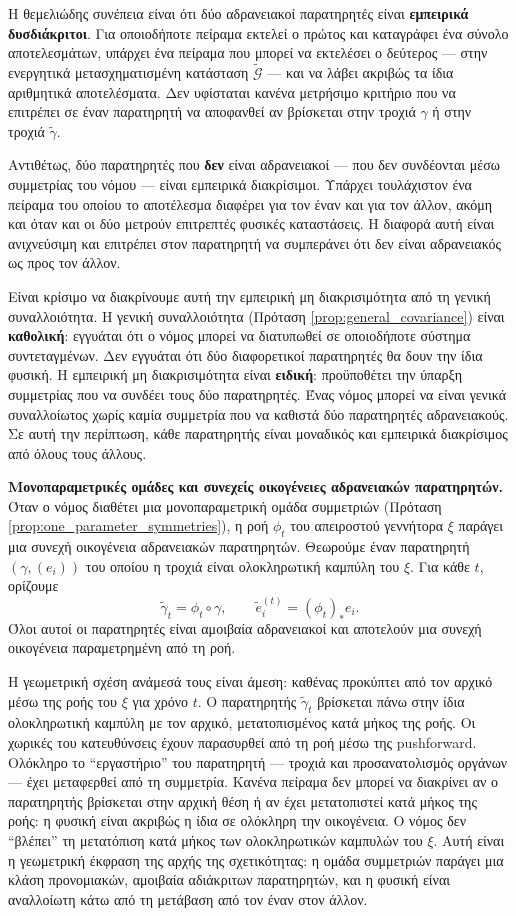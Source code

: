 \documentclass[11pt,a4paper,twoside,openright]{book}
\begin{document}
Η θεμελιώδης συνέπεια είναι ότι δύο αδρανειακοί παρατηρητές είναι \textbf{εμπειρικά δυσδιάκριτοι}. Για οποιοδήποτε πείραμα εκτελεί ο πρώτος και καταγράφει ένα σύνολο αποτελεσμάτων, υπάρχει ένα πείραμα που μπορεί να εκτελέσει ο δεύτερος — στην ενεργητικά μετασχηματισμένη κατάσταση $\tilde{\mathcal{G}}$ — και να λάβει ακριβώς τα ίδια αριθμητικά αποτελέσματα. Δεν υφίσταται κανένα μετρήσιμο κριτήριο που να επιτρέπει σε έναν παρατηρητή να αποφανθεί αν βρίσκεται στην τροχιά $\gamma$ ή στην τροχιά $\tilde{\gamma}$.

Αντιθέτως, δύο παρατηρητές που \textbf{δεν} είναι αδρανειακοί — που δεν συνδέονται μέσω συμμετρίας του νόμου — είναι εμπειρικά διακρίσιμοι. Υπάρχει τουλάχιστον ένα πείραμα του οποίου το αποτέλεσμα διαφέρει για τον έναν και για τον άλλον, ακόμη και όταν και οι δύο μετρούν επιτρεπτές φυσικές καταστάσεις. Η διαφορά αυτή είναι ανιχνεύσιμη και επιτρέπει στον παρατηρητή να συμπεράνει ότι δεν είναι αδρανειακός ως προς τον άλλον.

Είναι κρίσιμο να διακρίνουμε αυτή την εμπειρική μη διακρισιμότητα από τη γενική συναλλοιότητα. Η γενική συναλλοιότητα (Πρόταση \ref{prop:general_covariance}) είναι \textbf{καθολική}: εγγυάται ότι ο νόμος μπορεί να διατυπωθεί σε οποιοδήποτε σύστημα συντεταγμένων. Δεν εγγυάται ότι δύο διαφορετικοί παρατηρητές θα δουν την ίδια φυσική. Η εμπειρική μη διακρισιμότητα είναι \textbf{ειδική}: προϋποθέτει την ύπαρξη συμμετρίας που να συνδέει τους δύο παρατηρητές. Ένας νόμος μπορεί να είναι γενικά συναλλοίωτος χωρίς καμία συμμετρία που να καθιστά δύο παρατηρητές αδρανειακούς. Σε αυτή την περίπτωση, κάθε παρατηρητής είναι μοναδικός και εμπειρικά διακρίσιμος από όλους τους άλλους.

\textbf{Μονοπαραμετρικές ομάδες και συνεχείς οικογένειες αδρανειακών παρατηρητών.} Όταν ο νόμος διαθέτει μια μονοπαραμετρική ομάδα συμμετριών (Πρόταση \ref{prop:one_parameter_symmetries}), η ροή $\phi_t$ του απειροστού γεννήτορα $\xi$ παράγει μια συνεχή οικογένεια αδρανειακών παρατηρητών. Θεωρούμε έναν παρατηρητή $(\gamma, (e_i))$ του οποίου η τροχιά είναι ολοκληρωτική καμπύλη του $\xi$. Για κάθε $t$, ορίζουμε
\[
\tilde{\gamma}_t = \phi_t \circ \gamma, \qquad \tilde{e}_i^{(t)} = (\phi_t)_* e_i.
\]
Όλοι αυτοί οι παρατηρητές είναι αμοιβαία αδρανειακοί και αποτελούν μια συνεχή οικογένεια παραμετρημένη από τη ροή.

Η γεωμετρική σχέση ανάμεσά τους είναι άμεση: καθένας προκύπτει από τον αρχικό μέσω της ροής του $\xi$ για χρόνο $t$. Ο παρατηρητής $\tilde{\gamma}_t$ βρίσκεται πάνω στην ίδια ολοκληρωτική καμπύλη με τον αρχικό, μετατοπισμένος κατά μήκος της ροής. Οι χωρικές του κατευθύνσεις έχουν παρασυρθεί από τη ροή μέσω της pushforward. Ολόκληρο το ``εργαστήριο'' του παρατηρητή — τροχιά και προσανατολισμός οργάνων — έχει μεταφερθεί από τη συμμετρία. Κανένα πείραμα δεν μπορεί να διακρίνει αν ο παρατηρητής βρίσκεται στην αρχική θέση ή αν έχει μετατοπιστεί κατά μήκος της ροής: η φυσική είναι ακριβώς η ίδια σε ολόκληρη την οικογένεια. Ο νόμος δεν ``βλέπει'' τη μετατόπιση κατά μήκος των ολοκληρωτικών καμπυλών του $\xi$. Αυτή είναι η γεωμετρική έκφραση της αρχής της σχετικότητας: η ομάδα συμμετριών παράγει μια κλάση προνομιακών, αμοιβαία αδιάκριτων παρατηρητών, και η φυσική είναι αναλλοίωτη κάτω από τη μετάβαση από τον έναν στον άλλον.
\end{document}

